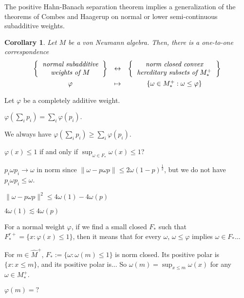 \documentclass[noamsfonts,a4paper,10pt]{amsart}
\theoremstyle{plain}
\newtheorem{cor}[thm]{Corollary}
\theoremstyle{definition}
\theoremstyle{remark}
\begin{document}
The positive Hahn-Banach separation theorem implies a generalization of the theorems of Combes and Haagerup on normal or lower semi-continuous subadditive weights.
\begin{cor}
Let $M$ be a von Neumann algebra.
Then, there is a one-to-one correspondence
\[\begin{array}{ccc}
\left\{\emph{\begin{tabular}{c}normal subadditive\\weights of $M$\end{tabular}}\right\}&\leftrightarrow&\left\{\emph{\begin{tabular}{c}norm closed convex\\hereditary subsets of $M_*^+$\end{tabular}}\right\}\\[10pt]
\varphi&\mapsto&\{\omega\in M_*^+:\omega\le\varphi\}
\end{array}\]
\end{cor}


Let $\varphi$ be a completely additive weight.

$\varphi(\sum_ip_i)=\sum_i\varphi(p_i)$.

We always have $\varphi(\sum_ip_i)\ge\sum_i\varphi(p_i)$.


$\varphi(x)\le1$ if and only if $\sup_{\omega\in F_*}\omega(x)\le1$?




$p_i\omega p_i\to\omega$ in norm since $\|\omega-p\omega p\|\le2\omega(1-p)^{\frac12}$, but we do not have $p_i\omega p_i\le\omega$.

$\|\omega-p\omega p\|^2\le4\omega(1)-4\omega(p)$

$4\omega(1)\lesssim 4\omega(p)$


For a normal weight $\varphi$, if we find a small closed $F_*$ such that $F_*^{r+}=\{x:\varphi(x)\le1\}$, then it means that for every $\omega$, $\omega\le\varphi$ implies $\omega\in F_*$...


For $m\in\widehat M^+$, $F_*:=\{\omega:\omega(m)\le1\}$ is norm closed.
Its positive polar is $\{x:x\le m\}$, and its positive polar is...
So $\omega(m)=\sup_{x\le m}\omega(x)$ for any $\omega\in M_*^+$.


$\varphi(m)=?$
\end{document}
